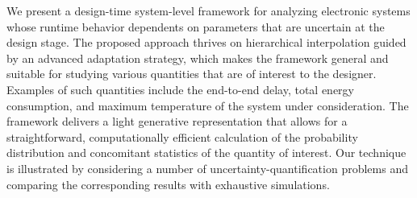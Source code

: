 We present a design-time system-level framework for analyzing electronic systems
whose runtime behavior dependents on parameters that are uncertain at the design
stage. The proposed approach thrives on hierarchical interpolation guided by an
advanced adaptation strategy, which makes the framework general and suitable for
studying various quantities that are of interest to the designer. Examples of
such quantities include the end-to-end delay, total energy consumption, and
maximum temperature of the system under consideration. The framework delivers a
light generative representation that allows for a straightforward,
computationally efficient calculation of the probability distribution and
concomitant statistics of the quantity of interest. Our technique is illustrated
by considering a number of uncertainty-quantification problems and comparing the
corresponding results with exhaustive simulations.
